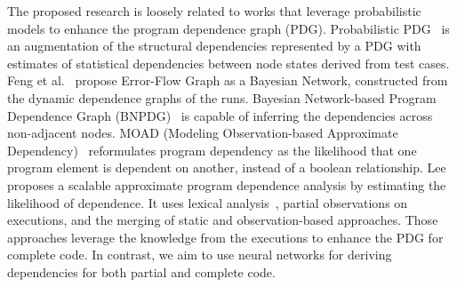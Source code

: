 The proposed research is loosely related to works that leverage probabilistic models to enhance the program dependence graph (PDG). Probabilistic PDG~\cite{baah-issta08-probabilistic} is an augmentation of the structural dependencies represented by a PDG with estimates of statistical dependencies between node states derived from test cases. Feng et al.~\cite{feng-paste10} propose Error-Flow Graph as a Bayesian Network, constructed from the dynamic dependence graphs of the runs. Bayesian Network-based Program Dependence Graph (BNPDG)~\cite{yu-jss17-bayesian} is capable of inferring the dependencies across non-adjacent nodes. MOAD (Modeling Observation-based Approximate Dependency)~\cite{lee-scam19-moad} reformulates program dependency as the likelihood that one program element is dependent on another, instead of a boolean relationship.  Lee~\cite{lee-icse20} proposes a scalable approximate program dependence analysis by estimating the likelihood of dependence. It uses lexical analysis~\cite{lee-jss20}, partial observations on executions, and the merging of static and observation-based approaches. Those approaches leverage the knowledge from the executions to enhance the PDG for complete code. In contrast, we aim to use neural networks for deriving dependencies for both partial and complete code.

